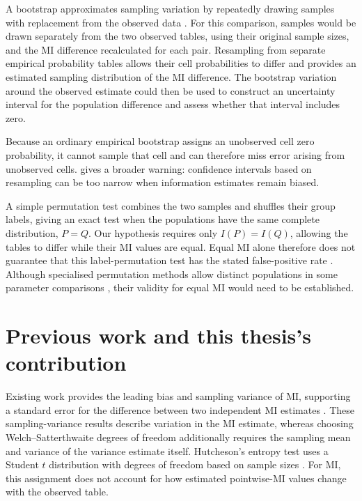 A bootstrap approximates sampling variation by repeatedly drawing samples
with replacement from the observed data \citep{efron1979}. For this
comparison, samples would be drawn separately from the two observed tables,
using their original sample sizes, and the MI difference recalculated for
each pair. Resampling from separate empirical probability tables allows
their cell probabilities to differ and provides an estimated sampling
distribution of the MI difference. The bootstrap
variation around the observed estimate could then be used to construct
an uncertainty interval for the population difference and assess whether
that interval includes zero.

Because an ordinary empirical bootstrap assigns an unobserved cell zero
probability, it cannot sample that cell and can therefore miss error
arising from unobserved cells. \citet{paninski2003} gives a broader warning: confidence
intervals based on resampling can be too narrow when information estimates
remain biased.

A simple permutation test combines the two samples and shuffles their
group labels, giving an exact test when the populations have the same
complete distribution, \(P=Q\). Our hypothesis requires only
\(I(P)=I(Q)\), allowing the tables to differ while their MI values are
equal. Equal MI alone therefore does not guarantee that this label-permutation test
has the stated false-positive rate \citep{chung2013}.
Although specialised permutation methods allow distinct populations in
some parameter comparisons \citep{janssen1997,chung2013}, their validity
for equal MI would need to be established.

\section{Previous work and this thesis's contribution}

Existing work provides the leading bias and sampling variance of MI,
supporting a standard error for the difference between two independent
MI estimates
\citep{miller1955,moddemeijer1989,brillinger2004,paninski2003}.
These sampling-variance results describe variation in the MI estimate,
whereas choosing Welch--Satterthwaite degrees of freedom additionally
requires the sampling mean and variance of the variance estimate itself.
Hutcheson's entropy test uses a Student \(t\) distribution with degrees of
freedom based on sample sizes \citep{hutcheson1970}. For MI, this assignment
does not account for how estimated pointwise-MI values change with the
observed table.

